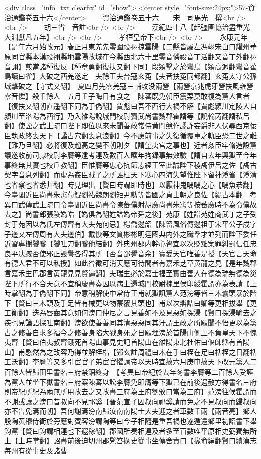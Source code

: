 <div class="info_txt clearfix" id="show">
<center style="font-size:24px;">57-資治通鑑卷五十六</center>
  　　資治通鑑卷五十六　　宋　司馬光　撰<br />
<br />
　　胡三省　音註<br />
<br />
　　漢紀四十八【起彊圉協洽盡重光大淵獻凡五年】<br />
<br />
　　孝桓皇帝下<br />
<br />
　　永康元年【是年六月始改元】春正月東羌先零圍祋祤掠雲陽【二縣皆屬左馮翊宋白曰耀州華原同官縣本漢祋祤縣地雲陽故城在今縣西北六十里零音憐祋音丁活翻又音丁外翻祤音詡】煎當諸種復反【種章勇翻復扶又翻下同】段熲擊之於鸞鳥【熲高迥翻鸞音雚鳥讀曰雀】大破之西羌遂定　夫餘王夫台寇玄菟【夫音扶莬同都翻】玄菟太守公孫域擊破之【守式又翻】　夏四月先零羌寇三輔攻没兩營【兩營京兆虎牙營扶風雍營零音憐】殺千餘人　五月壬子晦日有食之　陳蕃既免朝臣震栗莫敢復為黨人言者【復扶又翻朝直遥翻下同為于偽翻】賈彪曰吾不西行大禍不解【賈彪潁川定陵人自潁川至洛陽為西行】乃入雒陽說城門校尉竇武尚書魏郡霍諝等【說輸芮翻諝私呂翻】使訟之武上疏曰陛下即位以來未聞善政常侍黄門競作譎詐妄爵非人伏尋西京佞臣執政終喪天下【譎古穴翻喪息浪翻】今不慮前事之失復循覆車之軌臣恐二世之難【難乃旦翻】必將復及趙高之變不朝則夕【謂望夷宫之事也】近者姦臣牢脩造設黨議遂收前司隷校尉李膺等逮考連及數百人曠年拘録事無效驗【謂自去年興獄至今年事終無其實也校戶教翻】臣惟膺等忠心抗節志經王室此誠陛下稷卨伊呂之佐【卨古契字音息列翻】而虚為姦臣賊子之所誣枉天下寒心四海失望惟陛下留神澄省【澄清也省察也省悉井翻】時見理出【賢曰時謂即時也】以厭神鬼喁喁之心【喁魚恭翻】今臺閣近臣尚書朱㝢荀鯤劉祐魏朗劉矩尹勲等皆國之貞士朝之良佐【緄古本翻　考異曰武傳武上疏曰令臺閻近臣尚書令陳蕃僕射胡廣尚書朱㝢等按蕃廣時不為令僕故去之】尚書郎張陵媯皓【媯俱為翻姓譜媯帝舜之後】苑康【姓譜苑姓商武丁之子受封于苑因以為氏左傳齊有大夫苑何忌】楊喬邊韶【陳留風俗傳邊祖于宋平公子戍字子邊又左傳周有大夫邊伯】戴恢等文質彬彬明逹國典内外之職羣才並列而陛下委任近習專樹饕餮【饕吐刀翻餮他結翻】外典州郡内幹心膂宜以次貶黜案罪糾罰信任忠良平决臧否使邪正毁譽各得其所【否音鄙譽音余】寶愛天官唯善是授【天官言天命有德人君不可以私授】如此咎徵可消天應可待間者有嘉禾芝草黄龍之見【是年魏郡言嘉禾生巴郡言黄龍見見賢遍翻】夫瑞生必於嘉士福至實由善人在德為瑞無德為災陛下所行不合天意不宜稱慶書奏因以病上還城門校尉槐里侯印綬霍諝亦為表請【上時掌翻為于偽翻下同】帝意稍解使中常侍王甫就獄訊黨人范滂等皆三木囊頭暴於階下【賢曰三木頭及手足皆有械更以物蒙覆其頭也】甫以次辯詰曰卿等更相拔舉【更工衡翻】迭為唇齒其意如何滂曰仲尼之言見善如不及見惡如探湯【賢曰探湯喻去之疾也見論語探吐南翻】滂欲使善善同其清惡惡同其汙謂王政之所願聞不悟更以為黨古之修善自求多福今之修善身陷大戮身死之日願埋滂於首陽山側上不負皇天下不愧夷齊【賢曰伯夷叔齊餓死首陽山事見史記首陽山在雒陽東北杜佑曰偃師縣有首陽山】甫愍然為之改容乃得並解桎梏【鄭玄註周禮曰木在手曰桎在足曰梏桎之日翻梏工沃翻】李膺等又多引宦官子弟宦官懼請帝以天時宜赦六月庚申赦天下改元黨人二百餘人皆歸田里書名三府禁錮終身　【考異曰帝紀於去年冬書李膺等二百餘人受誣為黨人並坐下獄書名三府案陳蕃以訟李膺免即膺等下獄已在前後遇赦方得書名三府則帝紀所紀為兩無所用故去之又故書三府為王府劉攽曰當為三府】范滂往候霍諝而不謝或讓之滂曰昔叔向不見祁奚【晉范宣子囚叔向祁奚請而免之不見叔向而歸叔向亦不告免焉而朝】吾何謝焉滂南歸汝南南陽士大夫迎之者車數千兩【兩音亮】鄉人殷陶黄穆侍衛於旁應對賓客滂謂陶等曰今子相隨是重吾禍也遂遁還鄉里初詔書下舉鉤黨【賢曰鉤謂相連也下遐稼翻】郡國所奏相連及者多至百數唯平原相史弼獨無所上【上時掌翻】詔書前後迫切州郡髠笞掾史從事坐傳舍責曰【掾俞絹翻賢曰續漢志每州有從事史及諸曹